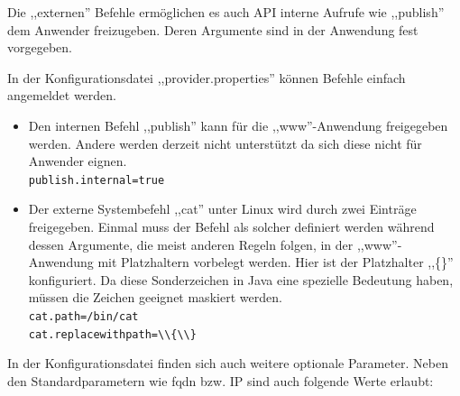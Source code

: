 \documentclass[oneside, ngerman, toc=bibliography,bibliography=totoc,listof=entryprefix, open=right,numbers=noenddot,fontsize=12pt]{scrbook}
\begin{document}
Die ,,externen'' Befehle ermöglichen es auch API interne Aufrufe wie ,,publish'' dem Anwender freizugeben.
Deren Argumente sind in der Anwendung fest vorgegeben. 

\bigskip
In der Konfigurationsdatei ,,provider.properties'' können Befehle einfach angemeldet werden.

\begin{itemize}
    \item Den internen Befehl ,,publish'' kann für die ,,www''-Anwendung freigegeben werden.
    Andere werden derzeit nicht unterstützt da sich diese nicht für Anwender eignen.\\
    \verb|publish.internal=true|
    
    \item Der externe Systembefehl ,,cat'' unter Linux wird durch zwei Einträge freigegeben. Einmal muss der Befehl als solcher definiert werden während dessen Argumente, die meist anderen Regeln folgen, in der ,,www''-Anwendung mit Platzhaltern vorbelegt werden. Hier ist der Platzhalter ,,\{\}'' konfiguriert. Da  diese Sonderzeichen in Java eine spezielle Bedeutung haben, müssen die Zeichen geeignet maskiert werden.
    \\
    \verb|cat.path=/bin/cat|\\
    \verb|cat.replacewithpath=\\{\\}|
    
\end{itemize}

 

In der Konfigurationsdatei finden sich auch weitere optionale Parameter. Neben den Standardparametern wie \acrshort{fqdn} bzw. IP sind auch folgende Werte erlaubt:\\
\end{document}
